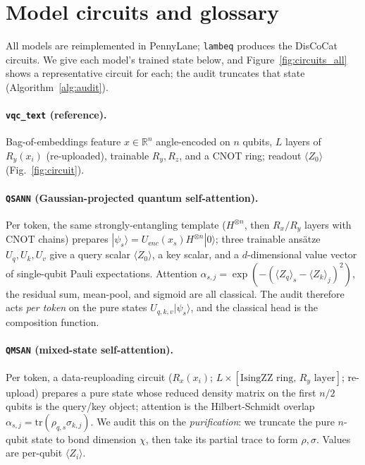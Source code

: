 \section{Model circuits and glossary}\label{app:circuits}
All models are reimplemented in PennyLane; \texttt{lambeq} produces the DisCoCat circuits. We
give each model's trained state below, and Figure~\ref{fig:circuits_all} shows a representative
circuit for each; the audit truncates that state (Algorithm~\ref{alg:audit}).







\paragraph{\texttt{vqc\_text} (reference).} Bag-of-embeddings feature $x\in\mathbb{R}^{n}$
angle-encoded on $n$ qubits, $L$ layers of $R_y(x_i)$ (re-uploaded), trainable $R_y,R_z$, and a
CNOT ring; readout $\langle Z_0\rangle$ (Fig.~\ref{fig:circuit}).

\paragraph{\texttt{QSANN} (Gaussian-projected quantum self-attention).} Per token, the same
strongly-entangling template ($H^{\otimes n}$, then $R_x/R_y$ layers with CNOT chains) prepares
$|\psi_s\rangle=U_{\mathrm enc}(x_s)H^{\otimes n}|0\rangle$; three trainable ansätze
$U_q,U_k,U_v$ give a query scalar $\langle Z_0\rangle$, a key scalar, and a $d$-dimensional value
vector of single-qubit Pauli expectations. Attention $\alpha_{s,j}=\exp(-(\langle
Z_q\rangle_s-\langle Z_k\rangle_j)^2)$, the residual sum, mean-pool, and sigmoid are all
classical. The audit therefore acts \emph{per token} on the pure states
$U_{q,k,v}|\psi_s\rangle$, and the classical head is the composition function.

\paragraph{\texttt{QMSAN} (mixed-state self-attention).} Per token, a data-reuploading circuit
($R_x(x_i)$; $L\times[\text{IsingZZ ring},\,R_y\text{ layer}]$; re-upload) prepares a pure state
whose reduced density matrix on the first $n/2$ qubits is the query/key object; attention is the
Hilbert-Schmidt overlap $\alpha_{s,j}=\mathrm{tr}(\rho_{q,s}\sigma_{k,j})$. We audit this on the
\emph{purification}: we truncate the pure $n$-qubit state to bond dimension $\chi$, then take its
partial trace to form $\rho,\sigma$. Values are per-qubit $\langle Z_i\rangle$.

